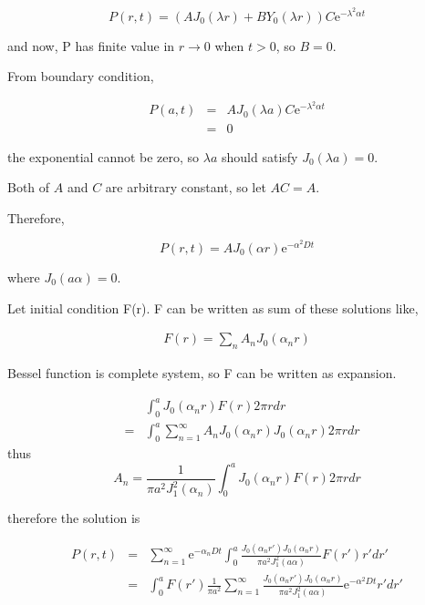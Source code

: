 \documentclass{article}
\begin{document}
\begin{equation}
    P(r, t) = (AJ_0(\lambda r) + BY_0(\lambda r) )
              C \mathrm{e}^{- \lambda^2 \alpha t} \nonumber
\end{equation}

and now, P has finite value in $r \rightarrow 0$ when $t>0$, so $B = 0$.

From boundary condition, 

\begin{eqnarray}
    P(a, t) &=& AJ_0(\lambda a) C \mathrm{e}^{- \lambda^2 \alpha t} \nonumber \\
            &=& 0 \nonumber
\end{eqnarray}

the exponential cannot be zero,
so $\lambda a$ should satisfy $J_0(\lambda a) = 0$.

Both of $A$ and $C$ are arbitrary constant, so let $AC = A$.

Therefore, 

\begin{equation}
    P(r, t) = AJ_0(\alpha r) \mathrm{e}^{-\alpha^2 Dt} \nonumber
\end{equation}

where $J_0(a\alpha) = 0$.

Let initial condition F(r). F can be written as sum of these solutions like,

\begin{eqnarray}
    F(r) = \sum_n A_n J_0(\alpha_n r) \nonumber
\end{eqnarray}

Bessel function is complete system, so F can be written as expansion.

\begin{eqnarray}
    & & \int^a_0 J_0(\alpha_n r) F(r) 2\pi rdr \nonumber \\
    &=& \int^a_0 \sum^\infty_{n=1} A_n J_0(\alpha_n r)J_0(\alpha_n r) 2\pi rdr
        \nonumber
\end{eqnarray}
thus
\begin {equation}
    A_n = \frac{1}{\pi a^2 J^2_1(\alpha_n)} \int^a_0 J_0(\alpha_n r)
          F(r) 2 \pi rdr \nonumber
\end{equation}

therefore the solution is

\begin{eqnarray}
    P(r,t) &=& \sum^\infty_{n=1} \mathrm{e}^{-\alpha_n Dt} 
               \int^a_0 \frac{J_0(\alpha_n r')J_0(\alpha_n r)}{\pi a^2 J^2_1(a\alpha)}
               F(r') r'dr' \nonumber \\
           &=& \int^a_0 F(r') \frac{1}{\pi a^2} \sum^\infty_{n=1}
               \frac{J_0(\alpha_n r')J_0(\alpha_n r)}{\pi a^2 J^2_1(a\alpha)}
               \mathrm{e}^{-\alpha^2 Dt} r' dr' \nonumber
\end{eqnarray}
\end{document}
